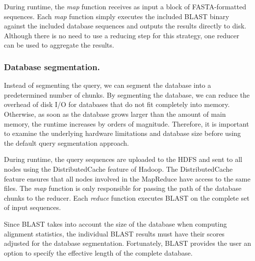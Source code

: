 During runtime, the \emph{map} function receives as input a block of FASTA-formatted sequences.
Each \emph{map} function simply executes the included BLAST binary against the included database sequences and outputs the results directly to disk.
Although there is no need to use a reducing step for this strategy, one reducer can be used to aggregate the results.

\subsubsection{Database segmentation.}

Instead of segmenting the query, we can segment the database into a predetermined number of chunks.
By segmenting the database, we can reduce the overhead of disk I/O for databases that do not fit completely into memory.
Otherwise, as soon as the database grows larger than the amount of main memory, the runtime increases by orders of magnitude\cite{darling2003design}.
Therefore, it is important to examine the underlying hardware limitations and database size before using the default query segmentation approach.

During runtime, the query sequences are uploaded to the HDFS and sent to all nodes using the DistributedCache feature of Hadoop.  The DistributedCache feature ensures that all nodes involved in the MapReduce have access to the same files.  The \emph{map} function is only responsible for passing the path of the database chunks to the reducer.  Each \emph{reduce} function executes BLAST on the complete set of input sequences.

Since BLAST takes into account the size of the database when computing alignment statistics, the individual BLAST results must have their scores adjusted for the database segmentation.
Fortunately, BLAST provides the user an option to specify the effective length of the complete database.

